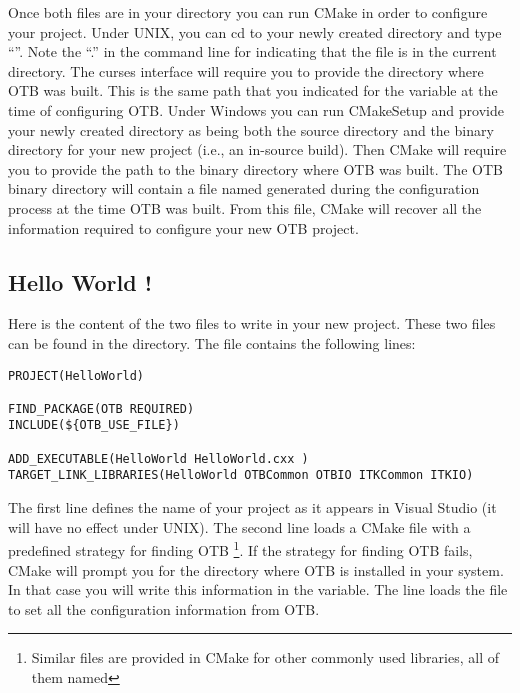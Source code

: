 Once both files are in your directory you can run CMake in order to configure
your project. Under UNIX, you can cd to your newly created directory
and type ``''. Note the ``.'' in the command line for indicating
that the  file is in the current directory. The
curses interface will require you to provide the directory where OTB
was built. This is the same path that you indicated for the
 variable at the time of configuring OTB. Under
Windows you can run CMakeSetup and provide your newly created
directory as being both the source directory and the binary directory for
your new project (i.e., an in-source build). Then CMake will require you to
provide the path to the binary directory where OTB was built. The OTB binary
directory will contain a file named  generated during the
configuration process at the time OTB was built.  From this file, CMake will
recover all the information required to configure your new OTB project.


\subsection{Hello World !}
\label{sec:HelloWorldOTB}


Here is the content of the two files to write in your new project. These two
files can be found in the  directory. The
 file contains the following lines:

\small
\begin{verbatim}
PROJECT(HelloWorld)

FIND_PACKAGE(OTB REQUIRED)
INCLUDE(${OTB_USE_FILE})

ADD_EXECUTABLE(HelloWorld HelloWorld.cxx )
TARGET_LINK_LIBRARIES(HelloWorld OTBCommon OTBIO ITKCommon ITKIO)
\end{verbatim}

\normalsize

The first line defines the name of your project as it appears in Visual
Studio (it will have no effect under UNIX). The second line loads a CMake
file with a predefined strategy for finding OTB \footnote{Similar files are
provided in CMake for other commonly used libraries, all of them named
}. If the strategy for finding OTB fails, CMake will prompt
you for the directory where OTB is installed in your system. In that case you
will write this information in the  variable. The line  loads the  file to set
all the configuration information from OTB.

